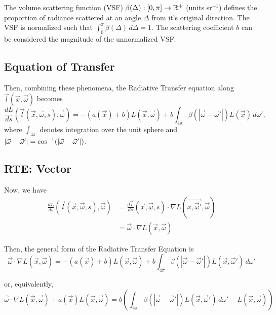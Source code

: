 The volume scattering function (VSF) $\beta(\Delta): [0, \pi] \to \mathbb{R}^+$ (units sr$^{-1}$) defines the
proportion of radiance scattered at an angle $\Delta$ from it's original
direction.
The VSF is normalized such that $\int_0^{\pi}\beta(\Delta)\,d\Delta = 1$.
The scattering coefficient $b$ can be considered the magnitude of the unnormalized VSF.

\subsection{Equation of Transfer}
Then, combining these phenomena, the Radiative Transfer equation along
$\vec{l}(\vec{x}, \vec{\omega})$ becomes
\begin{equation}
  \label{eqn:rte1d}
  \frac{dL}{ds}(\vec{l}(\vec{x}, \vec{\omega}, s), \vec{\omega})
  = -(a(\vec{x}) + b)L(\vec{x}, \vec{\omega})
  + b \int_{4\pi} \beta(|\vec{\omega} - \vec{\omega}'|) L(\vec{x})\, d\omega',
\end{equation}
where $\int_{4\pi}$ denotes integration over the unit sphere and
$|\vec{\omega}-\vec{\omega}'| = \cos^{-1}(\left| \vec{\omega} - \vec{\omega}' \right|)$.

\subsection{RTE: Vector}

Now, we have
\begin{align*}
  \frac{dL}{ds}(\vec{l}(\vec{x}, \vec{\omega}, s), \vec{\omega})
    &= \frac{d\vec{l}}{ds}(\vec{x}, \vec{\omega}, s) \cdot \nabla L(\vec{x, \vec{\omega}'}, \vec{\omega}) \\
    &= \vec{\omega} \cdot \nabla L(\vec{x}, \vec{\omega})
\end{align*}

Then, the general form of the Radiative Transfer Equation is
\begin{equation}
  \vec{\omega} \cdot \nabla L(\vec{x}, \vec{\omega})
  = -(a(\vec{x}) + b)L(\vec{x}, \vec{\omega})
  + b \int_{4\pi} \beta(|\vec{\omega} - \vec{\omega}'|) L(\vec{x}, \vec{\omega}')\, d\omega'
\end{equation}

or, equivalently,
\begin{equation}
  \vec{\omega} \cdot \nabla L(\vec{x}, \vec{\omega})
  + a(\vec{x})L(\vec{x}, \vec{\omega})
  = b \left(
    \int_{4\pi} \beta(|\vec{\omega} - \vec{\omega}'|) L(\vec{x}, \vec{\omega}')\, d\omega'
    - L(\vec{x}, \vec{\omega})
  \right)
\end{equation}


